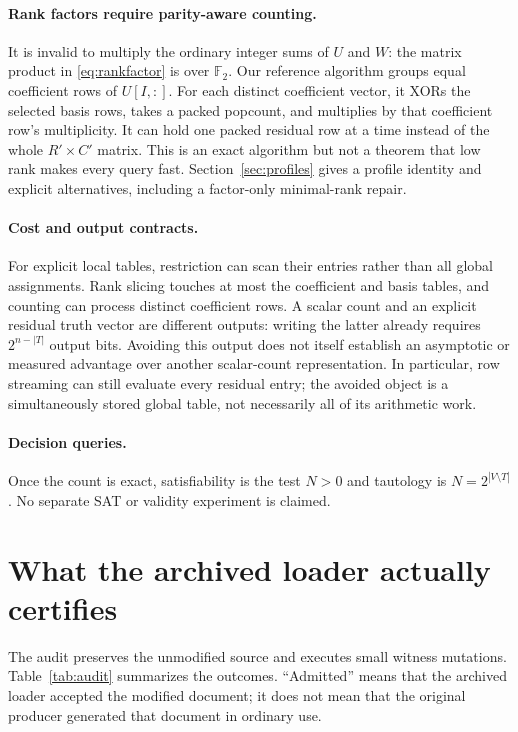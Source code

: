 \documentclass[11pt]{article}
\newcommand{\F}{\mathbb F_2}
\theoremstyle{definition}\newtheorem{definition}[theorem]{Definition}
\theoremstyle{remark}\newtheorem{remark}[theorem]{Remark}
\begin{document}
\paragraph{Rank factors require parity-aware counting.}
It is invalid to multiply the ordinary integer sums of $U$ and $W$: the matrix product in \eqref{eq:rankfactor} is over $\F$. Our reference algorithm groups equal coefficient rows of $U[I,:]$. For each distinct coefficient vector, it XORs the selected basis rows, takes a packed popcount, and multiplies by that coefficient row's multiplicity. It can hold one packed residual row at a time instead of the whole $R'\times C'$ matrix. This is an exact algorithm but not a theorem that low rank makes every query fast. Section~\ref{sec:profiles} gives a profile identity and explicit alternatives, including a factor-only minimal-rank repair.

\paragraph{Cost and output contracts.}
For explicit local tables, restriction can scan their entries rather than all global assignments. Rank slicing touches at most the coefficient and basis tables, and counting can process distinct coefficient rows. A scalar count and an explicit residual truth vector are different outputs: writing the latter already requires $2^{n-|T|}$ output bits. Avoiding this output does not itself establish an asymptotic or measured advantage over another scalar-count representation. In particular, row streaming can still evaluate every residual entry; the avoided object is a simultaneously stored global table, not necessarily all of its arithmetic work.

\paragraph{Decision queries.}
Once the count is exact, satisfiability is the test $N>0$ and tautology is $N=2^{|V\setminus T|}$. No separate SAT or validity experiment is claimed.





\section{What the archived loader actually certifies}
\label{sec:audit}
The audit preserves the unmodified source and executes small witness mutations. Table~\ref{tab:audit} summarizes the outcomes. ``Admitted'' means that the archived loader accepted the modified document; it does not mean that the original producer generated that document in ordinary use.
\end{document}
